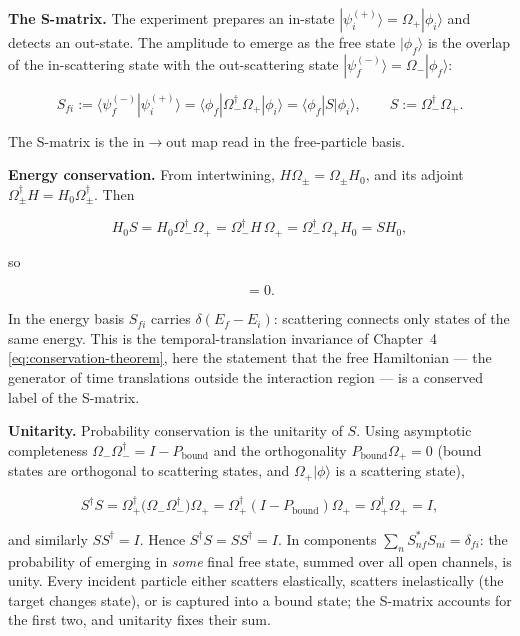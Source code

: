 \medskip\noindent\textbf{The S-matrix.} The experiment prepares an in-state $|\psi_{i}^{(+)}\rangle=\Omega_{+}|\phi_{i}\rangle$ and detects an out-state. The amplitude to emerge as the free state $|\phi_{f}\rangle$ is the overlap of the in-scattering state with the out-scattering state $|\psi_{f}^{(-)}\rangle=\Omega_{-}|\phi_{f}\rangle$:
\begin{linenomath}
\begin{equation}
S_{fi} := \langle\psi_{f}^{(-)}|\psi_{i}^{(+)}\rangle
= \langle\phi_{f}|\Omega_{-}^{\dagger}\Omega_{+}|\phi_{i}\rangle
= \langle\phi_{f}|S|\phi_{i}\rangle,
\qquad
S := \Omega_{-}^{\dagger}\Omega_{+}.
\label{eq:S-matrix-def}
\end{equation}
\end{linenomath}
The S-matrix is the in$\to$out map read in the free-particle basis.

\medskip\noindent\textbf{Energy conservation.} From intertwining, $H\Omega_{\pm}=\Omega_{\pm}H_{0}$, and its adjoint $\Omega_{\pm}^{\dagger}H = H_{0}\Omega_{\pm}^{\dagger}$. Then
\begin{linenomath}
\begin{equation*}
H_{0}S = H_{0}\Omega_{-}^{\dagger}\Omega_{+} = \Omega_{-}^{\dagger}H\,\Omega_{+} = \Omega_{-}^{\dagger}\Omega_{+}H_{0} = S H_{0},
\end{equation*}
\end{linenomath}
so
\begin{linenomath}
\begin{equation}
[S,H_{0}] = 0.
\label{eq:S-commutes-H0}
\end{equation}
\end{linenomath}
In the energy basis $S_{fi}$ carries $\delta(E_{f}-E_{i})$: scattering connects only states of the same energy. This is the temporal-translation invariance of Chapter~4 \eqref{eq:conservation-theorem}, here the statement that the free Hamiltonian --- the generator of time translations outside the interaction region --- is a conserved label of the S-matrix.

\medskip\noindent\textbf{Unitarity.} Probability conservation is the unitarity of $S$. Using asymptotic completeness $\Omega_{-}\Omega_{-}^{\dagger}=I-P_{\mathrm{bound}}$ and the orthogonality $P_{\mathrm{bound}}\Omega_{+}=0$ (bound states are orthogonal to scattering states, and $\Omega_{+}|\phi\rangle$ is a scattering state),
\begin{linenomath}
\begin{equation*}
S^{\dagger}S = \Omega_{+}^{\dagger}\bigl(\Omega_{-}\Omega_{-}^{\dagger}\bigr)\Omega_{+} = \Omega_{+}^{\dagger}(I-P_{\mathrm{bound}})\Omega_{+} = \Omega_{+}^{\dagger}\Omega_{+} = I,
\end{equation*}
\end{linenomath}
and similarly $SS^{\dagger}=I$. Hence $S^{\dagger}S=SS^{\dagger}=I$. In components $\sum_{n}S_{nf}^{*}S_{ni}=\delta_{fi}$: the probability of emerging in \emph{some} final free state, summed over all open channels, is unity. Every incident particle either scatters elastically, scatters inelastically (the target changes state), or is captured into a bound state; the S-matrix accounts for the first two, and unitarity fixes their sum.

